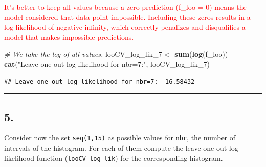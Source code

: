 \documentclass[
]{article}
\newenvironment{Shaded}{\begin{snugshade}}{\end{snugshade}}
\newcommand{\CommentTok}[1]{\textcolor[rgb]{0.56,0.35,0.01}{\textit{#1}}}
\newcommand{\FunctionTok}[1]{\textcolor[rgb]{0.13,0.29,0.53}{\textbf{#1}}}
\newcommand{\NormalTok}[1]{#1}
\newcommand{\OtherTok}[1]{\textcolor[rgb]{0.56,0.35,0.01}{#1}}
\newcommand{\StringTok}[1]{\textcolor[rgb]{0.31,0.60,0.02}{#1}}
\begin{document}
\textcolor{red}{It's better to keep all values because a zero prediction (f_loo = 0) means the model considered that data point impossible. Including these zeros results in a log-likelihood of negative infinity, which correctly penalizes and disqualifies a model that makes impossible predictions.}

\begin{Shaded}
\begin{Highlighting}[]
\CommentTok{\# We take the log of all values.}
\NormalTok{looCV\_log\_lik\_7 }\OtherTok{\textless{}{-}} \FunctionTok{sum}\NormalTok{(}\FunctionTok{log}\NormalTok{(f\_loo))}
\FunctionTok{cat}\NormalTok{(}\StringTok{"Leave{-}one{-}out log{-}likelihood for nbr=7:"}\NormalTok{, looCV\_log\_lik\_7)}
\end{Highlighting}
\end{Shaded}

\begin{verbatim}
## Leave-one-out log-likelihood for nbr=7: -16.58432
\end{verbatim}

\begin{center}\rule{0.5\linewidth}{0.5pt}\end{center}

\subsection{5.}\label{section-4}

Consider now the set \texttt{seq(1,15)} as possible values for
\texttt{nbr}, the number of intervals of the histogram. For each of them
compute the leave-one-out log-likelihood function
(\texttt{looCV\_log\_lik}) for the corresponding histogram.
\end{document}
